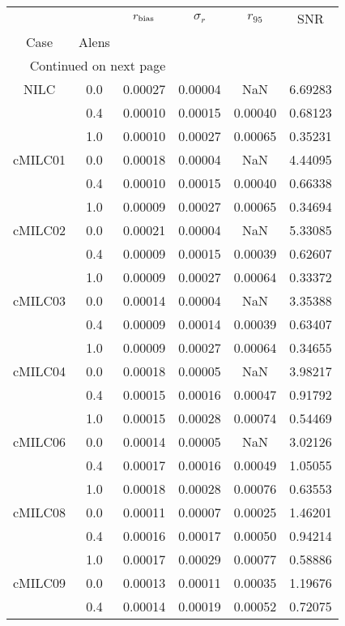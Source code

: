 \begin{longtable}{cccccc}
\toprule
     &     &  $r_{\rm bias}$  &  $\sigma_r$ &  $r_{95}$ &     SNR \\
Case & Alens &                  &             &           &         \\
\midrule
\endhead
\midrule
\multicolumn{3}{r}{{Continued on next page}} \\
\midrule
\endfoot

\bottomrule
\endlastfoot
NILC & 0.0 & 0.00027 & 0.00004 & NaN & 6.69283 \\
     & 0.4 & 0.00010 & 0.00015 & 0.00040 & 0.68123 \\
     & 1.0 & 0.00010 & 0.00027 & 0.00065 & 0.35231 \\
cMILC01 & 0.0 & 0.00018 & 0.00004 & NaN & 4.44095 \\
     & 0.4 & 0.00010 & 0.00015 & 0.00040 & 0.66338 \\
     & 1.0 & 0.00009 & 0.00027 & 0.00065 & 0.34694 \\
cMILC02 & 0.0 & 0.00021 & 0.00004 & NaN & 5.33085 \\
     & 0.4 & 0.00009 & 0.00015 & 0.00039 & 0.62607 \\
     & 1.0 & 0.00009 & 0.00027 & 0.00064 & 0.33372 \\
cMILC03 & 0.0 & 0.00014 & 0.00004 & NaN & 3.35388 \\
     & 0.4 & 0.00009 & 0.00014 & 0.00039 & 0.63407 \\
     & 1.0 & 0.00009 & 0.00027 & 0.00064 & 0.34655 \\
cMILC04 & 0.0 & 0.00018 & 0.00005 & NaN & 3.98217 \\
     & 0.4 & 0.00015 & 0.00016 & 0.00047 & 0.91792 \\
     & 1.0 & 0.00015 & 0.00028 & 0.00074 & 0.54469 \\
cMILC06 & 0.0 & 0.00014 & 0.00005 & NaN & 3.02126 \\
     & 0.4 & 0.00017 & 0.00016 & 0.00049 & 1.05055 \\
     & 1.0 & 0.00018 & 0.00028 & 0.00076 & 0.63553 \\
cMILC08 & 0.0 & 0.00011 & 0.00007 & 0.00025 & 1.46201 \\
     & 0.4 & 0.00016 & 0.00017 & 0.00050 & 0.94214 \\
     & 1.0 & 0.00017 & 0.00029 & 0.00077 & 0.58886 \\
cMILC09 & 0.0 & 0.00013 & 0.00011 & 0.00035 & 1.19676 \\
     & 0.4 & 0.00014 & 0.00019 & 0.00052 & 0.72075 \\

\end{longtable}
